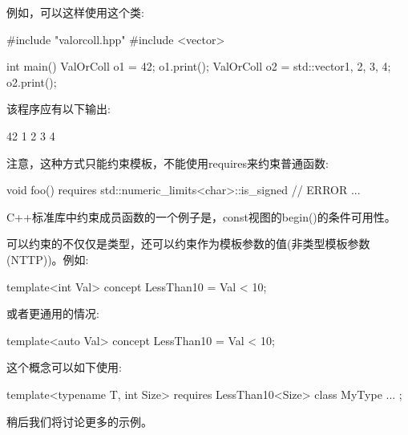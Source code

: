 例如，可以这样使用这个类:


\begin{cpp}
#include "valorcoll.hpp"
#include <vector>

int main()
{
	ValOrColl o1 = 42;
	o1.print();
	ValOrColl o2 = std::vector{1, 2, 3, 4};
	o2.print();
}
\end{cpp}

该程序应有以下输出:

\begin{shell}
42
1 2 3 4
\end{shell}

注意，这种方式只能约束模板，不能使用requires来约束普通函数:

\begin{cpp}
void foo() requires std::numeric_limits<char>::is_signed // ERROR
{
	...
}
\end{cpp}

C++标准库中约束成员函数的一个例子是，const视图的begin()的条件可用性。


可以约束的不仅仅是类型，还可以约束作为模板参数的值(非类型模板参数(NTTP))。例如:

\begin{cpp}
template<int Val>
concept LessThan10 = Val < 10;
\end{cpp}

或者更通用的情况:

\begin{cpp}
template<auto Val>
concept LessThan10 = Val < 10;
\end{cpp}

这个概念可以如下使用:

\begin{cpp}
template<typename T, int Size>
requires LessThan10<Size>
class MyType {
	...
};
\end{cpp}

稍后我们将讨论更多的示例。










